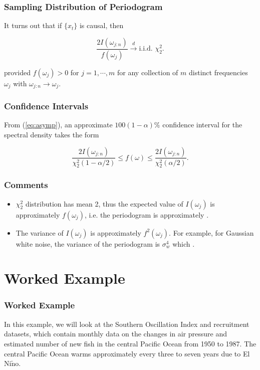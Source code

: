 \documentclass[%
xcolor=pdftex]{beamer}
\begin{document}
\begin{frame}
\frametitle{Sampling Distribution of Periodogram}

It turns out that if $\{ x_t \}$ is causal, then

\begin{equation} \label{eq:asymp}
\frac{2 I(\omega_{j:n})}{f(\omega_j)} \xrightarrow{d} \text{i.i.d. } \chi_2^2.
\end{equation}

provided $f(\omega_j) > 0$ for $j = 1, \cdots, m$ for any collection of $m$ distinct frequencies $\omega_j$ with $\omega_{j:n} \to \omega_j$.

\end{frame}

\begin{frame}
\frametitle{Confidence Intervals}

From (\ref{eq:asymp}), an approximate $100(1-\alpha)\%$ confidence interval for the spectral density takes the form

\begin{equation} \label{eq:CI}
\frac{2 I(\omega_{j:n})}{\chi_2^2(1-\alpha/2)} \leq f(\omega) \leq \frac{2 I(\omega_{j:n})}{\chi_2^2(\alpha/2)}.
\end{equation}

\end{frame}

\begin{frame}
\frametitle{Comments}

\begin{itemize}
\item $\chi_2^2$ distribution has mean 2, thus the expected value of $I(\omega_j)$ is approximately $f(\omega_j)$, i.e. the periodogram is approximately \underline{\hspace{15 mm}}.
\item The variance of $I(\omega_j)$ is approximately $f^2(\omega_j)$. For example, for Gaussian white noise, the variance of the periodogram is $\sigma_w^4$ which \underline{\hspace{40 mm}}.
\end{itemize}

\end{frame}


\section{Worked Example}
\frame{\tableofcontents[currentsection]}

\begin{frame}
\frametitle{Worked Example}

In this example, we will look at the Southern Oscillation Index and recruitment datasets, which contain monthly data on the changes in air pressure and estimated number of new fish in the central Pacific Ocean from 1950 to 1987. The central Pacific Ocean warms approximately every three to seven years due to El Ni$\tilde{\text{n}}$o.

\end{frame}
\end{document}
